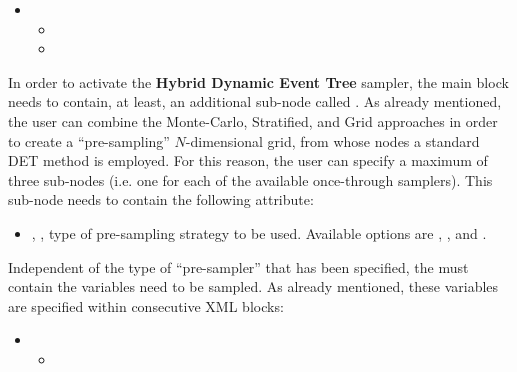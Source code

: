 
\begin{itemize}
  \item \variableDescription
  \variableChildrenIntro
  \begin{itemize}
    \item \distributionDescription
    \item \gridDescription
  \end{itemize}
\end{itemize}

In order to activate the \textbf{Hybrid Dynamic Event Tree}  sampler, the main 
 block needs to contain, at least, an additional
sub-node called .
%
As already mentioned, the user can combine the Monte-Carlo, Stratified, and Grid
approaches in order to create a ``pre-sampling'' $N$-dimensional grid, from
whose nodes a standard DET method is employed.
%
For this reason, the user can specify a maximum of three
 sub-nodes (i.e. one for each of the available
once-through samplers).
%
This sub-node needs to contain the following attribute:
\begin{itemize}
  \item {}, , type of
    pre-sampling strategy to be used.
    Available options are , , and
    .
 \end{itemize}

Independent of the type of ``pre-sampler'' that has been specified, the 
 must contain the variables need to be sampled.
%
As already mentioned, these variables are specified within consecutive
 XML blocks:

\begin{itemize}
  \item \variableDescription
    \variableChildIntro
    \begin{itemize}
      \item \distributionDescription
    \end{itemize}
 \end{itemize}

